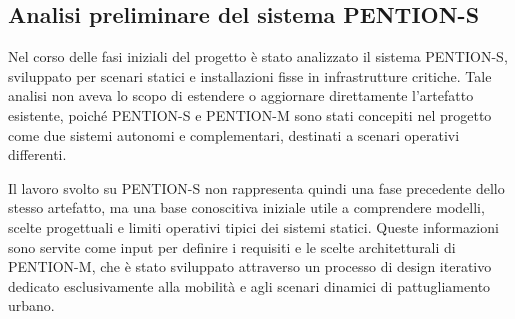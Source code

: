 
\subsection{Analisi preliminare del sistema PENTION-S}

Nel corso delle fasi iniziali del progetto è stato analizzato il sistema \textsc{PENTION-S}, sviluppato per scenari statici e installazioni fisse in infrastrutture critiche. Tale analisi non aveva lo scopo di estendere o aggiornare direttamente l’artefatto esistente, poiché \textsc{PENTION-S} e \textsc{PENTION-M} sono stati concepiti nel progetto come due sistemi autonomi e complementari, destinati a scenari operativi differenti. 

Il lavoro svolto su \textsc{PENTION-S} non rappresenta quindi una fase precedente dello stesso artefatto, ma una base conoscitiva iniziale utile a comprendere modelli, scelte progettuali e limiti operativi tipici dei sistemi statici. Queste informazioni sono servite come input per definire i requisiti e le scelte architetturali di \textsc{PENTION-M}, che è stato sviluppato attraverso un processo di design iterativo dedicato esclusivamente alla mobilità e agli scenari dinamici di pattugliamento urbano.
